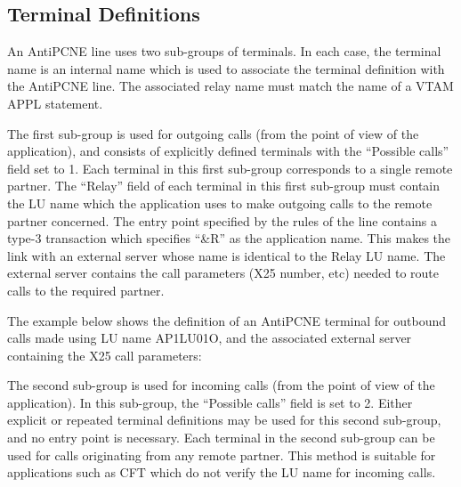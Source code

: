 \documentclass[letterpaper,10pt,english]{sphinxmanual}
\begin{document}
\ignorespaces 

\subsection{Terminal Definitions}
\label{\detokenize{connectivity_guide:index-84}}\label{\detokenize{connectivity_guide:id41}}
An AntiPCNE line uses two sub-groups of terminals. In each case, the terminal name is an internal name which is used to associate the terminal definition with the AntiPCNE line. The associated relay name must match the name of a VTAM APPL statement.

The first sub-group is used for outgoing calls (from the point of view of the application), and consists of explicitly defined  terminals with the “Possible calls” field set to 1. Each terminal in this first sub-group corresponds to a single remote partner. The “Relay” field of each terminal in this first sub-group must contain the LU name which the application uses to make outgoing calls to the remote partner concerned. The entry point specified by the rules of the line contains a type-3 transaction which specifies “\&R” as the
application name. This makes the link with an external server whose name is identical to the Relay LU name. The external server contains the call parameters (X25 number, etc) needed to route calls to the required partner.

The example below shows the definition of an AntiPCNE terminal for outbound calls made using LU name AP1LU01O, and the associated external server containing the X25 call parameters:



The second sub-group is used for incoming calls (from the point of view of the application). In this sub-group, the “Possible calls” field is set to 2. Either explicit or repeated terminal definitions may be used for this second sub-group, and no entry point is necessary. Each terminal in the second sub-group can be used for calls originating from any remote partner. This method is suitable for applications such as CFT which do not verify the LU name for incoming calls.
\end{document}

